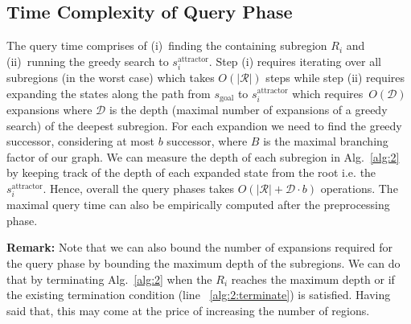 \documentclass[letterpaper]{article} %
\newcommand{\calR}{\ensuremath{\mathcal{R}}\xspace}
\newcommand{\calD}{\ensuremath{\mathcal{D}}\xspace}
\newcommand{\sAttract}{\ensuremath{s^{\text{attractor}}_i}\xspace}
\newcommand{\sGoal}{\ensuremath{s_{\text{goal}}\xspace}}
\newtheorem{lemma}{Lemma}
\begin{document}
%

\subsection{Time Complexity of Query Phase}
\label{subsec:complexity}
The query time comprises of 
(i)~finding the containing subregion $R_i$ 
and
(ii)~running the greedy search to $\sAttract$.
Step (i) requires iterating over all subregions (in the worst case) which takes $O(|\calR|)$ steps while 
step (ii) requires expanding the states along the path from $\sGoal$ to $\sAttract$ which requires~$O(\calD)$ expansions where $\calD$ is the depth (maximal number of expansions of a greedy search) of the deepest subregion. 
For each expandion we need to find the greedy successor, considering at most $b$ successor, where $B$ is the maximal branching factor of our graph.
We can measure the depth of each subregion in Alg.~\ref{alg:2} by keeping track of the depth of each expanded state from the root i.e. the $\sAttract$. Hence, overall the query phases takes $O(|\calR| + \calD \cdot b)$ operations. The maximal query time can also be empirically computed after the preprocessing phase.

%
\textbf{Remark:}
Note that we can also bound the number of expansions required for the query phase by bounding the maximum depth of the subregions. We can do that by terminating Alg.~\ref{alg:2} when the $R_i$ reaches the maximum depth or if the existing termination condition (line ~\ref{alg:2:terminate}) is satisfied.
Having said that, this may come at the price of increasing the number of regions.
\end{document}
